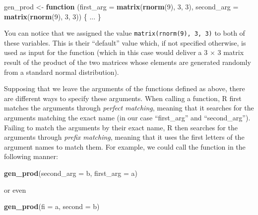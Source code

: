 \documentclass[12pt,]{krantz}
\newenvironment{Shaded}{\begin{snugshade}}{\end{snugshade}}
\newcommand{\KeywordTok}[1]{\textcolor[rgb]{0.27,0.27,0.27}{\textbf{#1}}}
\newcommand{\DataTypeTok}[1]{\textcolor[rgb]{0.27,0.27,0.27}{#1}}
\newcommand{\DecValTok}[1]{\textcolor[rgb]{0.06,0.06,0.06}{#1}}
\newcommand{\StringTok}[1]{\textcolor[rgb]{0.5,0.5,0.5}{#1}}
\newcommand{\ControlFlowTok}[1]{\textcolor[rgb]{0.27,0.27,0.27}{\textbf{#1}}}
\newcommand{\NormalTok}[1]{#1}
\begin{document}
\begin{Shaded}
\begin{Highlighting}[]
\NormalTok{gen_prod <-}\StringTok{ }\ControlFlowTok{function}\NormalTok{ (}\DataTypeTok{first_arg =} \KeywordTok{matrix}\NormalTok{(}\KeywordTok{rnorm}\NormalTok{(}\DecValTok{9}\NormalTok{), }\DecValTok{3}\NormalTok{, }\DecValTok{3}\NormalTok{), }
                      \DataTypeTok{second_arg =} \KeywordTok{matrix}\NormalTok{(}\KeywordTok{rnorm}\NormalTok{(}\DecValTok{9}\NormalTok{), }\DecValTok{3}\NormalTok{, }\DecValTok{3}\NormalTok{)) \{}
\NormalTok{  ...}
\NormalTok{\}}
\end{Highlighting}
\end{Shaded}

You can notice that we assigned the value
\texttt{matrix(rnorm(9),\ 3,\ 3)} to both of these variables. This is
their ``default'' value which, if not specified otherwise, is used as
input for the function (which in this case would deliver a 3 \(\times\)
3 matrix result of the product of the two matrices whose elements are
generated randomly from a standard normal distribution).

Supposing that we leave the arguments of the functions defined as above,
there are different ways to specify these arguments. When calling a
function, R first matches the arguments through \emph{perfect matching},
meaning that it searches for the arguments matching the exact name (in
our case ``first\_arg'' and ``second\_arg''). Failing to match the
arguments by their exact name, R then searches for the arguments through
\emph{prefix matching}, meaning that it uses the first letters of the
argument names to match them. For example, we could call the function in
the following manner:

\begin{Shaded}
\begin{Highlighting}[]
\KeywordTok{gen_prod}\NormalTok{(}\DataTypeTok{second_arg =}\NormalTok{ b, }\DataTypeTok{first_arg =}\NormalTok{ a)}
\end{Highlighting}
\end{Shaded}

or even

\begin{Shaded}
\begin{Highlighting}[]
\KeywordTok{gen_prod}\NormalTok{(}\DataTypeTok{fi =}\NormalTok{ a, }\DataTypeTok{second =}\NormalTok{ b)}
\end{Highlighting}
\end{Shaded}
\end{document}

